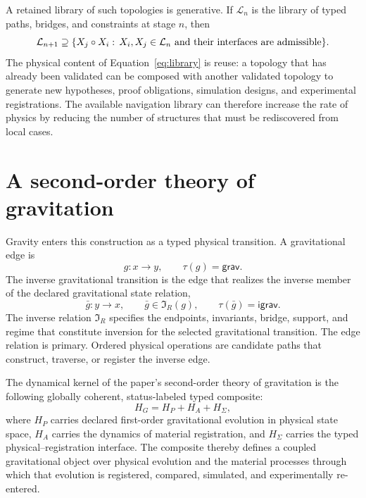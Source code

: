 \documentclass[10pt,twoside,a5paper]{article}
\newcommand{\Inv}{\ensuremath{\mathfrak I}}
\newcommand{\Grav}{\ensuremath{\mathsf{grav}}}
\newcommand{\IGrav}{\ensuremath{\mathsf{igrav}}}
\theoremstyle{definition}
\begin{document}
A retained library of such topologies is generative. If $\mathcal L_n$ is the
library of typed paths, bridges, and constraints at stage $n$, then
\begin{equation}
\mathcal L_{n+1}\supseteq
\{X_j\circ X_i:\,X_i,X_j\in\mathcal L_n\ \hbox{and their interfaces are admissible}\}.
\label{eq:library}
\end{equation}
The physical content of Equation~\eqref{eq:library} is reuse: a topology that has
already been validated can be composed with another validated topology to generate
new hypotheses, proof obligations, simulation designs, and experimental
registrations. The available navigation library can therefore increase the rate of
physics by reducing the number of structures that must be rediscovered from local
cases.


\section{A second-order theory of gravitation}
\label{sec:gravity}

Gravity enters this construction as a typed physical transition. A gravitational
edge is
\begin{equation}
g:x\longrightarrow y,
\qquad \tau(g)=\Grav.
\label{eq:gravity-edge}
\end{equation}
The inverse gravitational transition is the edge that realizes the inverse member
of the declared gravitational state relation,
\begin{equation}
\bar g:y\longrightarrow x,
\qquad \bar g\in\Inv_R(g),
\qquad \tau(\bar g)=\IGrav.
\label{eq:inverse-edge}
\end{equation}
The inverse relation $\Inv_R$ specifies the endpoints, invariants, bridge, support,
and regime that constitute inversion for the selected gravitational transition.
The edge relation is primary. Ordered physical operations are candidate paths that
construct, traverse, or register the inverse edge.

The dynamical kernel of the paper's second-order theory of gravitation is the
following globally coherent, status-labeled typed composite:
\begin{equation}
H_G=H_P+H_A+H_\Sigma,
\label{eq:second-order-gravitational-kernel}
\end{equation}
where $H_P$ carries declared first-order gravitational evolution in physical state
space, $H_A$ carries the dynamics of material registration, and $H_\Sigma$ carries the
typed physical--registration interface. The composite thereby defines a coupled
gravitational object over physical evolution and the material processes through which
that evolution is registered, compared, simulated, and experimentally re-entered.
\end{document}
